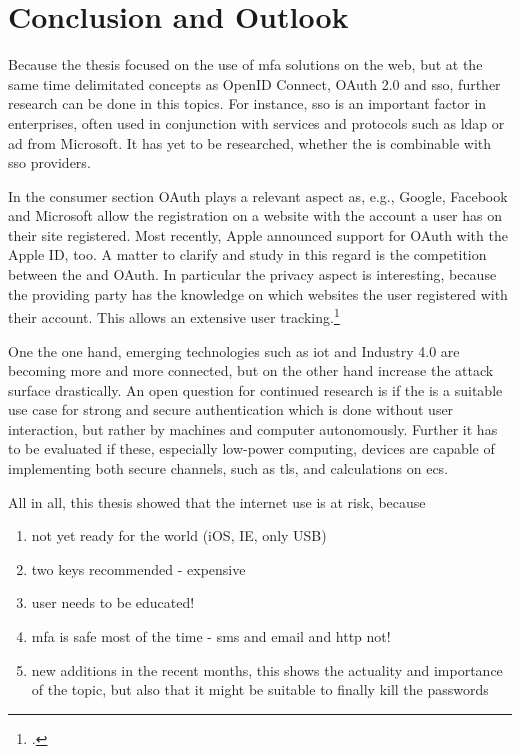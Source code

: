 \chapter{Conclusion and Outlook}


Because the thesis focused on the use of \gls{mfa} solutions on the web, but at the same time delimitated concepts as OpenID Connect, OAuth 2.0 and \gls{sso}, further research can be done in this topics. For instance, \gls{sso} is an important factor in enterprises, often used in conjunction with services and protocols such as \gls{ldap} or \gls{ad} from Microsoft. It has yet to be researched, whether the \wa{} is combinable with \gls{sso} providers.

In the consumer section OAuth plays a relevant aspect as, e.g., Google, Facebook and Microsoft allow the registration on a website with the account a user has on their site registered. Most recently, Apple announced support for OAuth with the Apple ID, too. A matter to clarify and study in this regard is the competition between the \wa{} and OAuth. In particular the privacy aspect is interesting, because the providing party has the knowledge on which websites the user registered with their account. This allows an extensive user tracking.\footcites[See][18]{fido-ct-2}[See][4]{osti_1257179}

One the one hand, emerging technologies such as \gls{iot} and Industry 4.0 are becoming more and more connected, but on the other hand increase the attack surface drastically. An open question for continued research is if the \wa{} is a suitable use case for strong and secure authentication which is done without user interaction, but rather by machines and computer autonomously. Further it has to be evaluated if these, especially low-power computing, devices are capable of implementing both secure channels, such as \gls{tls}, and calculations on \glspl{ec}.


All in all, this thesis showed that the internet use is at risk, because 












\begin{enumerate}
	\item not yet ready for the world (iOS, IE, only USB)
	\item two keys recommended - expensive
	\item user needs to be educated!
	\item mfa is safe most of the time - sms and email and http not!
	\item new additions in the recent months, this shows the actuality and importance of the topic, but also that it might be suitable to finally kill the passwords
\end{enumerate}